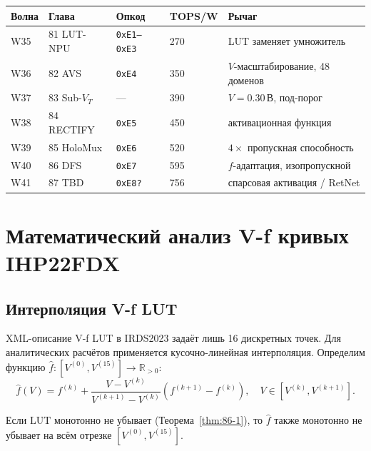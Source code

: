 \begin{center}
\begin{tabular}{lllll}
\hline
Волна & Глава & Опкод & TOPS/W & Рычаг \\
\hline
W35 & 81 LUT-NPU & \texttt{0xE1--0xE3} & 270 & LUT заменяет умножитель \\
W36 & 82 AVS     & \texttt{0xE4}       & 350 & $V$-масштабирование, 48 доменов \\
W37 & 83 Sub-$V_T$ & —                 & 390 & $V{=}0.30\,\text{В}$, под-порог \\
W38 & 84 RECTIFY & \texttt{0xE5}       & 450 & активационная функция \\
W39 & 85 HoloMux & \texttt{0xE6}       & 520 & $4\times$ пропускная способность \\
W40 & 86 DFS     & \texttt{0xE7}       & 595 & $f$-адаптация, изопропускной \\
W41 & 87 TBD     & \texttt{0xE8?}      & 756 & спарсовая активация / RetNet \\
\hline
\end{tabular}
\end{center}

\section{Математический анализ V-f кривых IHP22FDX}
\label{sec:glava86-math-vf}

\subsection{Интерполяция V-f LUT}
\label{subsec:vf-interpolation}

XML-описание V-f LUT в IRDS2023 задаёт лишь 16 дискретных точек.
Для аналитических расчётов применяется кусочно-линейная интерполяция.
Определим функцию $\hat{f}: [V^{(0)}, V^{(15)}] \to \mathbb{R}_{>0}$:
\begin{equation}
  \hat{f}(V) = f^{(k)} + \frac{V - V^{(k)}}{V^{(k+1)} - V^{(k)}}
                \left(f^{(k+1)} - f^{(k)}\right),
  \quad V \in [V^{(k)}, V^{(k+1)}].
  \label{eq:vf-interpolation}
\end{equation}

\begin{proposition}
\label{prop:vf-interp-monotone}
Если $\mathrm{LUT}$ монотонно не убывает (Теорема~\ref{thm:86-1}),
то $\hat{f}$ также монотонно не убывает на всём отрезке $[V^{(0)}, V^{(15)}]$.
\end{proposition}

